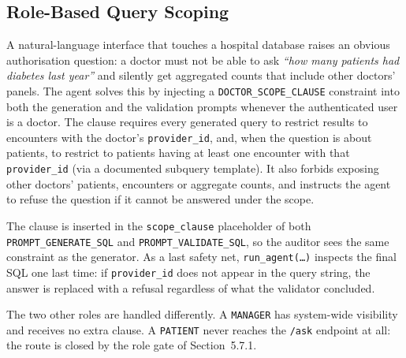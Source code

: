 \subsection{Role-Based Query Scoping}

A natural-language interface that touches a hospital database raises an obvious authorisation question: a doctor must not be able to ask \emph{``how many patients had diabetes last year''} and silently get aggregated counts that include other doctors' panels. The agent solves this by injecting a \texttt{DOCTOR\_SCOPE\_CLAUSE} constraint into both the generation and the validation prompts whenever the authenticated user is a doctor. The clause requires every generated query to restrict results to encounters with the doctor's \texttt{provider\_id}, and, when the question is about patients, to restrict to patients having at least one encounter with that \texttt{provider\_id} (via a documented subquery template). It also forbids exposing other doctors' patients, encounters or aggregate counts, and instructs the agent to refuse the question if it cannot be answered under the scope.

The clause is inserted in the \texttt{scope\_clause} placeholder of both \texttt{PROMPT\_GENERATE\_SQL} and \texttt{PROMPT\_VALIDATE\_SQL}, so the auditor sees the same constraint as the generator. As a last safety net, \texttt{run\_agent(\ldots)} inspects the final SQL one last time: if \texttt{provider\_id} does not appear in the query string, the answer is replaced with a refusal regardless of what the validator concluded.

The two other roles are handled differently. A \texttt{MANAGER} has system-wide visibility and receives no extra clause. A \texttt{PATIENT} never reaches the \texttt{/ask} endpoint at all: the route is closed by the role gate of Section~5.7.1.
